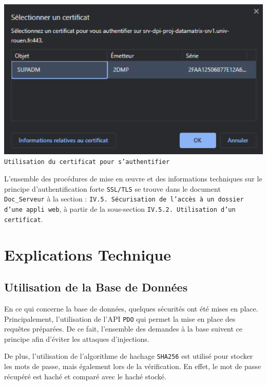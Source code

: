 \begin{center}
    \includegraphics[scale=0.4]{imgs/spadm.PNG}
    \\\texttt{Utilisation du certificat pour s'authentifier}
\end{center}

L'ensemble des procédures de mise en œuvre et des informations techniques sur le principe d'authentification forte \texttt{SSL/TLS} se trouve dans le document \texttt{Doc\Securisation\_Serveur} à la section : \texttt{IV.5. Sécurisation de l’accès à un dossier d’une appli web}, à partir de la sous-section \texttt{IV.5.2. Utilisation d’un certificat}.

\section{Explications Technique}

\subsection{Utilisation de la Base de Données}

En ce qui concerne la base de données, quelques sécurités ont été mises en place. Principalement, l'utilisation de l'API \texttt{PDO} qui permet la mise en place des requêtes préparées. De ce fait, l'ensemble des demandes à la base suivent ce principe afin d'éviter les attaques d'injections.

De plus, l'utilisation de l'algorithme de hachage \texttt{SHA256} est utilisé pour stocker les mots de passe, mais également lors de la vérification. En effet, le mot de passe récupéré est haché et comparé avec le haché stocké.

